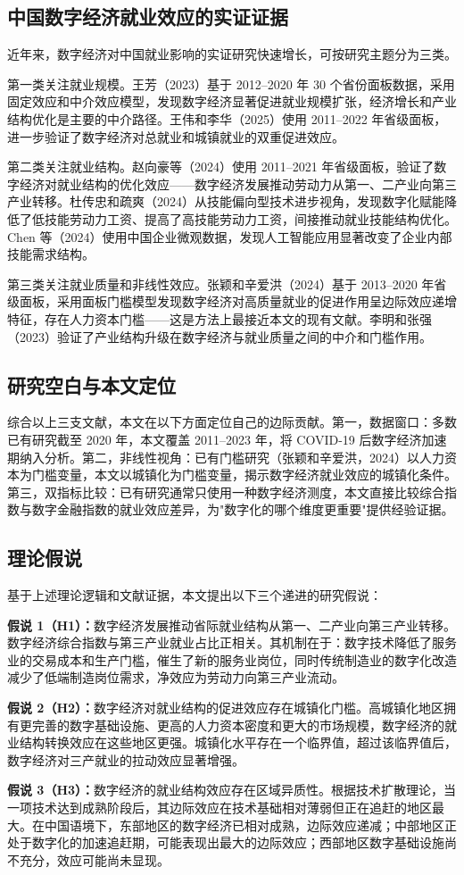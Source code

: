 \subsection{中国数字经济就业效应的实证证据}

近年来，数字经济对中国就业影响的实证研究快速增长，可按研究主题分为三类。

第一类关注就业规模。王芳（2023）基于 2012--2020 年 30 个省份面板数据，采用固定效应和中介效应模型，发现数字经济显著促进就业规模扩张，经济增长和产业结构优化是主要的中介路径。王伟和李华（2025）使用 2011--2022 年省级面板，进一步验证了数字经济对总就业和城镇就业的双重促进效应。

第二类关注就业结构。赵向豪等（2024）使用 2011--2021 年省级面板，验证了数字经济对就业结构的优化效应——数字经济发展推动劳动力从第一、二产业向第三产业转移。杜传忠和疏爽（2024）从技能偏向型技术进步视角，发现数字化赋能降低了低技能劳动力工资、提高了高技能劳动力工资，间接推动就业技能结构优化。Chen 等（2024）使用中国企业微观数据，发现人工智能应用显著改变了企业内部技能需求结构。

第三类关注就业质量和非线性效应。张颖和辛爱洪（2024）基于 2013--2020 年省级面板，采用面板门槛模型发现数字经济对高质量就业的促进作用呈边际效应递增特征，存在人力资本门槛——这是方法上最接近本文的现有文献。李明和张强（2023）验证了产业结构升级在数字经济与就业质量之间的中介和门槛作用。

\subsection{研究空白与本文定位}

综合以上三支文献，本文在以下方面定位自己的边际贡献。第一，数据窗口：多数已有研究截至 2020 年，本文覆盖 2011--2023 年，将 COVID-19 后数字经济加速期纳入分析。第二，非线性视角：已有门槛研究（张颖和辛爱洪，2024）以人力资本为门槛变量，本文以城镇化为门槛变量，揭示数字经济就业效应的城镇化条件。第三，双指标比较：已有研究通常只使用一种数字经济测度，本文直接比较综合指数与数字金融指数的就业效应差异，为"数字化的哪个维度更重要"提供经验证据。

\subsection{理论假说}

基于上述理论逻辑和文献证据，本文提出以下三个递进的研究假说：

\textbf{假说 1（H1）：}数字经济发展推动省际就业结构从第一、二产业向第三产业转移。数字经济综合指数与第三产业就业占比正相关。其机制在于：数字技术降低了服务业的交易成本和生产门槛，催生了新的服务业岗位，同时传统制造业的数字化改造减少了低端制造岗位需求，净效应为劳动力向第三产业流动。

\textbf{假说 2（H2）：}数字经济对就业结构的促进效应存在城镇化门槛。高城镇化地区拥有更完善的数字基础设施、更高的人力资本密度和更大的市场规模，数字经济的就业结构转换效应在这些地区更强。城镇化水平存在一个临界值，超过该临界值后，数字经济对三产就业的拉动效应显著增强。

\textbf{假说 3（H3）：}数字经济的就业结构效应存在区域异质性。根据技术扩散理论，当一项技术达到成熟阶段后，其边际效应在技术基础相对薄弱但正在追赶的地区最大。在中国语境下，东部地区的数字经济已相对成熟，边际效应递减；中部地区正处于数字化的加速追赶期，可能表现出最大的边际效应；西部地区数字基础设施尚不充分，效应可能尚未显现。
